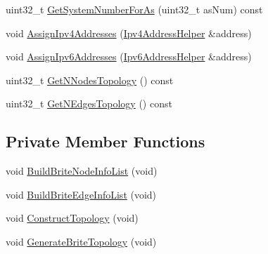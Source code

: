 \begin{DoxyCompactItemize}
\item 
uint32\+\_\+t \hyperlink{classns3_1_1BriteTopologyHelper_a9d6c4dde00885cf3570052dd8f31d343}{Get\+System\+Number\+For\+As} (uint32\+\_\+t as\+Num) const 
\item 
void \hyperlink{classns3_1_1BriteTopologyHelper_a6d3c5647200385372fa7847294a24741}{Assign\+Ipv4\+Addresses} (\hyperlink{classns3_1_1Ipv4AddressHelper}{Ipv4\+Address\+Helper} \&address)
\item 
void \hyperlink{classns3_1_1BriteTopologyHelper_a015db8f8f12141fa6ef6627973472bf2}{Assign\+Ipv6\+Addresses} (\hyperlink{classns3_1_1Ipv6AddressHelper}{Ipv6\+Address\+Helper} \&address)
\item 
uint32\+\_\+t \hyperlink{classns3_1_1BriteTopologyHelper_afa224e5abbe39447e39c11f04c5f3df3}{Get\+N\+Nodes\+Topology} () const 
\item 
uint32\+\_\+t \hyperlink{classns3_1_1BriteTopologyHelper_a84106a337b65ce1326496c850a13e6ea}{Get\+N\+Edges\+Topology} () const 
\end{DoxyCompactItemize}
\subsection*{Private Member Functions}
\begin{DoxyCompactItemize}
\item 
void \hyperlink{classns3_1_1BriteTopologyHelper_a537098e87487b7b76271386fbae015b9}{Build\+Brite\+Node\+Info\+List} (void)
\item 
void \hyperlink{classns3_1_1BriteTopologyHelper_ae82406d604814f64bb4ea46b5615ac19}{Build\+Brite\+Edge\+Info\+List} (void)
\item 
void \hyperlink{classns3_1_1BriteTopologyHelper_a39beaa3fb7f93fa98db00503a4b50de8}{Construct\+Topology} (void)
\item 
void \hyperlink{classns3_1_1BriteTopologyHelper_a16c360e3a41d15cba5c517f87574be7d}{Generate\+Brite\+Topology} (void)
\end{DoxyCompactItemize}
